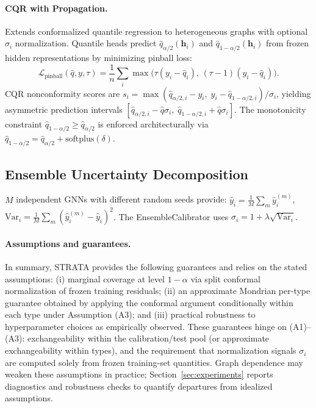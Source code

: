 \documentclass[twoside,11pt]{article}
\begin{document}
\paragraph{CQR with Propagation.} Extends conformalized quantile regression
\citep{romano2019conformalized} to heterogeneous graphs with optional
$\sigma_i$ normalization. Quantile heads predict
$\hat{q}_{\alpha/2}(\mathbf{h}_i)$ and $\hat{q}_{1-\alpha/2}(\mathbf{h}_i)$
from frozen hidden representations by minimizing pinball loss:
\begin{equation}
\mathcal{L}_{\text{pinball}}(\hat{q}, y, \tau) =
\frac{1}{n}\sum_i \max\!\bigl(\tau(y_i - \hat{q}_i),\, (\tau-1)(y_i - \hat{q}_i)\bigr).
\end{equation}
CQR nonconformity scores are
$s_i = \max(\hat{q}_{\alpha/2,i} - y_i,\; y_i - \hat{q}_{1-\alpha/2,i})/\sigma_i$,
yielding asymmetric prediction intervals
$[\hat{q}_{\alpha/2,i} - \hat{q}\sigma_i,\; \hat{q}_{1-\alpha/2,i} +
\hat{q}\sigma_i]$.
The monotonicity constraint $\hat{q}_{1-\alpha/2} \geq \hat{q}_{\alpha/2}$ is
enforced architecturally via $\hat{q}_{1-\alpha/2} = \hat{q}_{\alpha/2} +
\text{softplus}(\delta)$.

\subsection{Ensemble Uncertainty Decomposition}

$M$ independent GNNs with different random seeds provide:
$\hat{y}_i = \frac{1}{M}\sum_m \hat{y}_i^{(m)}$,
$\text{Var}_i = \frac{1}{M}\sum_m (\hat{y}_i^{(m)} - \hat{y}_i)^2$.
The EnsembleCalibrator uses $\sigma_i = 1 + \lambda \sqrt{\text{Var}_i}$.

\paragraph{Assumptions and guarantees.} In summary, STRATA provides the
following guarantees and relies on the stated assumptions: (i) marginal
coverage at level $1-\alpha$ via split conformal normalization of frozen
training residuals; (ii) an approximate Mondrian per-type guarantee obtained
by applying the conformal argument conditionally within each type under
Assumption (A3); and (iii) practical robustness to hyperparameter choices as
empirically observed. These guarantees hinge on (A1)--(A3): exchangeability
within the calibration/test pool (or approximate exchangeability within types),
and the requirement that normalization signals $\sigma_i$ are computed solely
from frozen training-set quantities. Graph dependence may weaken these
assumptions in practice; Section~\ref{sec:experiments} reports diagnostics and
robustness checks to quantify departures from idealized assumptions.
\end{document}
